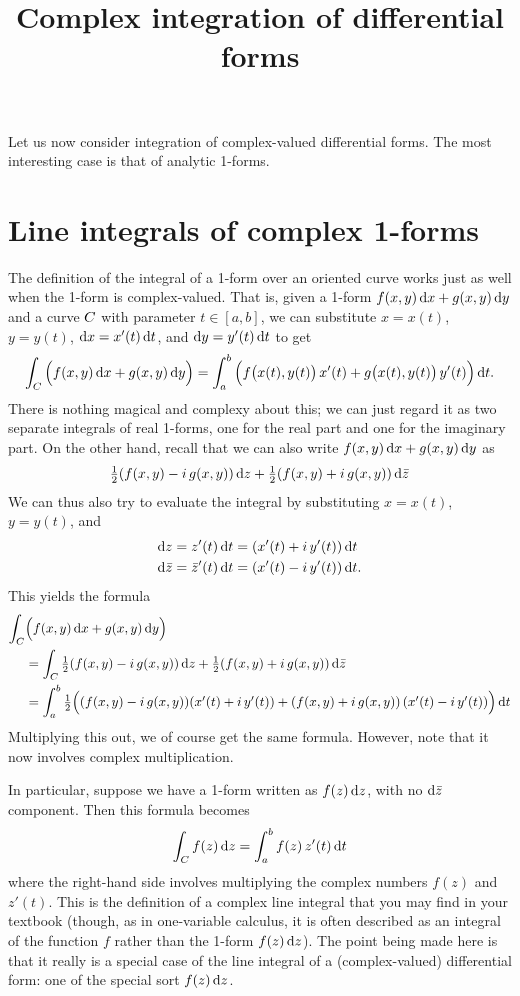 \documentclass[12pt]{amsart}
\title{Complex integration of differential forms}
\begin{document}
\maketitle

Let us now consider integration of complex-valued differential forms.
The most interesting case is that of analytic 1-forms.

\section{Line integrals of complex 1-forms}
\label{sec:complex-line-integrals}

The definition of the integral of a 1-form over an oriented curve works just as well when the 1-form is complex-valued.
That is, given a 1-form $f(x,y)\,\dx + g(x,y)\,\dy$ and a curve $\curve$ with parameter $t\in [a,b]$, we can substitute $x = x(t)$, $y=y(t)$, $\dx = x'(t)\,\dt$, and $\dy = y'(t)\,\dt$ to get
\[ \lint{\curve} \Big(f(x,y)\,\dx + g(x,y)\,\dy\Big) = \itint t a b {\Big( f\big(x(t),y(t)\big)\, x'(t) + g\big(x(t),y(t)\big)\,y'(t)\Big)}. \]
There is nothing magical and complexy about this; we can just regard it as two separate integrals of real 1-forms, one for the real part and one for the imaginary part.
On the other hand, recall that we can also write $f(x,y)\,\dx + g(x,y)\,\dy$ as
\[\half (f(x,y) -i\, g(x,y))\,\dz + \half (f(x,y) +i\, g(x,y))\,\dzbar \]
We can thus also try to evaluate the integral by substituting $x = x(t)$, $y=y(t)$, and
\begin{align*}
  \dz &= z'(t) \,\dt = (x'(t) + i\,y'(t))\,\dt\\
  \dzbar &= \zbar'(t) \,\dt = (x'(t) - i\,y'(t))\,\dt.
\end{align*}
This yields the formula
\begin{align*}
  \lint{\curve} &\Big(f(x,y)\,\dx + g(x,y)\,\dy\Big)\\
  &= \lint{\curve} \half (f(x,y) -i\, g(x,y))\,\dz + \half (f(x,y) +i\, g(x,y))\,\dzbar\\
  &= \itint t a b {\half \Big((f(x,y) -i\, g(x,y)) (x'(t) + i\,y'(t)) + (f(x,y) +i\, g(x,y))\,(x'(t) - i\,y'(t))\Big)}
\end{align*}
Multiplying this out, we of course get the same formula.
However, note that it now involves complex multiplication.

In particular, suppose we have a 1-form written as $f(z) \,\dz$, with no $\dzbar$ component.
Then this formula becomes
\[ \lint{\curve} f(z) \,\dz = \itint t a b {f(z)\, z'(t)}\]
where the right-hand side involves multiplying the complex numbers $f(z)$ and $z'(t)$.
This is the definition of a complex line integral that you may find in your textbook (though, as in one-variable calculus, it is often described as an integral of the function $f$ rather than the 1-form $f(z)\,\dz$).
The point being made here is that it really is a special case of the line integral of a (complex-valued) differential form: one of the special sort $f(z)\,\dz$.
\end{document}
